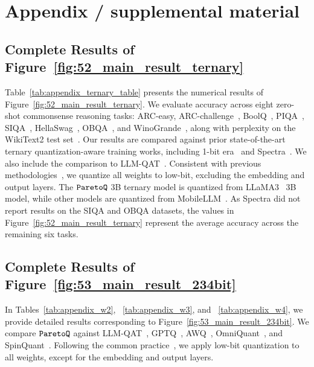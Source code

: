 \appendix
\onecolumn
\section{Appendix / supplemental material}

\subsection{Complete Results of Figure~\ref{fig:52_main_result_ternary}}
Table~\ref{tab:appendix_ternary_table} presents the numerical results of Figure~\ref{fig:52_main_result_ternary}. We evaluate accuracy across eight zero-shot commonsense reasoning tasks: ARC-easy, ARC-challenge~\citep{clark2018arc}, BoolQ~\citep{clark2019boolq}, PIQA~\citep{bisk2020piqa}, SIQA~\citep{sap2019siqa}, HellaSwag~\citep{zellers2019hellaswag}, OBQA~\citep{mihaylov2018obqa}, and WinoGrande~\citep{sakaguchi2021winogrande}, along with perplexity on the WikiText2 test set~\citep{merity2016wiki2}. Our results are compared against prior state-of-the-art ternary quantization-aware training works, including 1-bit era~\cite{ma2024era} and Spectra~\cite{spectra}. We also include the comparison to LLM-QAT~\citep{liu2023llmqat}. Consistent with previous methodologies~\cite{ma2024era,spectra}, we quantize all weights to low-bit, excluding the embedding and output layers. The $\texttt{ParetoQ}{}$ 3B ternary model is quantized from LLaMA3~\cite{llama3modelcard} 3B model, while other models are quantized from MobileLLM~\cite{liu2024mobilellm}. 
As Spectra did not report results on the SIQA and OBQA datasets, the values in Figure~\ref{fig:52_main_result_ternary} represent the average accuracy across the remaining six tasks.



\subsection{Complete Results of Figure~\ref{fig:53_main_result_234bit}}
In Tables~\ref{tab:appendix_w2}, ~\ref{tab:appendix_w3}, and ~\ref{tab:appendix_w4}, we provide detailed results corresponding to Figure~\ref{fig:53_main_result_234bit}. We compare $\texttt{ParetoQ}{}$ against LLM-QAT~\citep{liu2023llmqat}, GPTQ~\citep{frantar2022gptq}, AWQ~\citep{lin2023awq}, OmniQuant~\citep{shao2023omniquant}, and SpinQuant~\citep{liu2024spinquant}. Following the common practice~\cite{frantar2022gptq,liu2023llmqat}, we apply low-bit quantization to all weights, except for the embedding and output layers.




